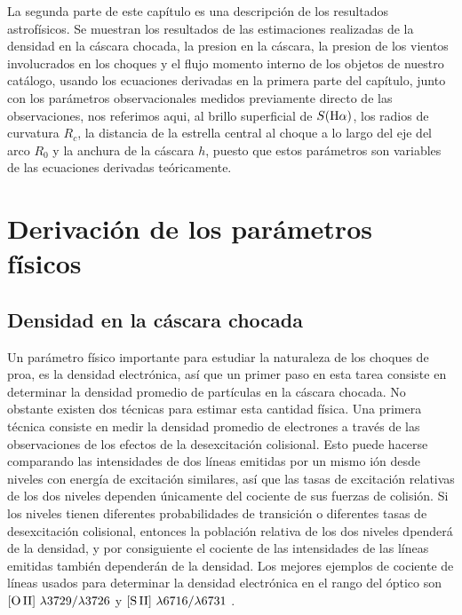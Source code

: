 La segunda parte de este capítulo es una descripción de los resultados astrofísicos. Se muestran los resultados de las estimaciones realizadas de la densidad en la cáscara chocada, la presion en la cáscara, la presion de los vientos involucrados en los choques y el flujo momento interno de los objetos de nuestro catálogo, usando los ecuaciones derivadas en la primera parte del capítulo, junto con los parámetros observacionales medidos previamente directo de las observaciones, nos referimos aqui, al brillo superficial de \ha{}  \(S(\mathrm{H}\alpha{})\), los radios de curvatura \(R_{c}\), la distancia de la estrella central al choque a lo largo del eje del arco \(R_{0}\) y la anchura de la cáscara \(h\), puesto que estos parámetros son variables de las ecuaciones derivadas teóricamente.

\section{Derivación de los parámetros físicos}
\label{sec:phy}

\subsection{Densidad  en la cáscara chocada }
\label{sec:densinty}

Un parámetro físico importante para estudiar la naturaleza de los choques de proa, es la densidad electrónica, así que un primer paso en esta tarea consiste en determinar la densidad promedio de partículas en la cáscara chocada. No obstante existen dos técnicas para estimar esta cantidad física. Una primera técnica consiste en medir la densidad promedio de electrones a través de las observaciones de los efectos de la desexcitación colisional. Esto puede hacerse comparando las intensidades de dos líneas emitidas por un mismo ión desde niveles con energía de excitación similares, así que las tasas de excitación relativas de los dos niveles dependen únicamente del cociente de sus fuerzas de colisión. Si los niveles tienen diferentes probabilidades de transición o diferentes tasas de desexcitación colisional, entonces la población relativa de los dos niveles dpenderá de la densidad, y por consiguiente el cociente de las intensidades de las líneas emitidas también dependerán de la densidad. Los mejores ejemplos de cociente de líneas usados para determinar la densidad electrónica en el rango del óptico son \(\mathrm{[O\,II]}~\lambda 3729/\lambda 3726\) y \(\mathrm{[S\,II]}~\lambda 6716/\lambda 6731\) \citep{Osterbrock:1989}.\\

